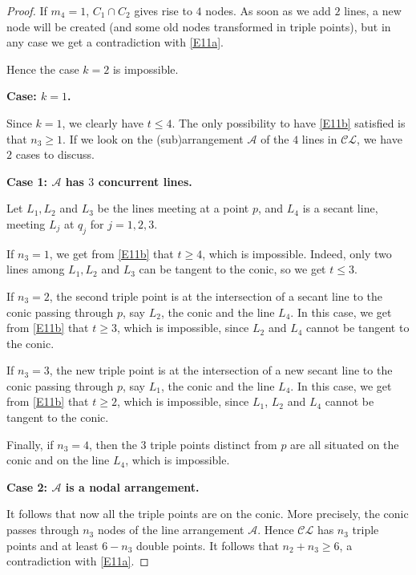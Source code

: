 \documentclass[12pt]{amsart}
\theoremstyle{plain}
\theoremstyle{definition}
\numberwithin{equation}{section}
\begin{document}
\begin{proof}
If $m_4=1$, $C_1\cap C_2$ gives rise to $4$ nodes. As soon as we add $2$ lines, a new node will be created (and some old nodes transformed in triple points), but in any case we get a contradiction with \eqref{E11a}.

Hence the case $k=2$ is impossible.

\medskip

{\bf Case: $k=1$.}

\medskip

Since $k=1$, we clearly have $t \leq 4$.
The only possibility to have \eqref{E11b} satisfied is that $n_3 \geq 1$.
If we look on the (sub)arrangement $\mathcal{A}$ of the $4$ lines in $\mathcal{CL}$, we have $2$ cases to discuss.

\medskip

{\bf Case 1: $\mathcal{A}$ has $3$ concurrent lines.}

\medskip

Let $L_1,L_2$ and $L_3$ be the lines meeting at a point $p$, and $L_4$ is a secant line, meeting $L_j$ at $q_j$ for $j=1,2,3$.

If $n_3=1$, we get from \eqref{E11b} that $t \geq 4$, which is impossible. Indeed, only two lines among $L_1,L_2$ and $L_3$ can be tangent to the conic, so we get $t \leq 3$.

If $n_3=2$, the second triple point is at the intersection of a secant line to the conic passing through $p$, say $L_2$, the conic and the line $L_4$. In this case, we get from \eqref{E11b} that $t \geq 3$, which is impossible, since $L_2$ and $L_4$ cannot be tangent to the conic.

If $n_3=3$, the new triple point is at the intersection of a new secant line to the conic passing through $p$, say $L_1$, the conic and the line $L_4$. In this case, we get from \eqref{E11b} that $t \geq 2$, which is impossible, since $L_1$, $L_2$ and $L_4$ cannot be tangent to the conic.

Finally, if $n_3=4$, then the 3 triple points distinct from $p$ are all situated on the conic and on the line $L_4$, which is impossible.

\medskip

{\bf Case 2: $\mathcal{A}$ is a nodal arrangement.}

\medskip

It follows that now all the triple points are on the conic. More precisely, the conic passes through $n_3$ nodes of the line arrangement $\mathcal{A}$. Hence $\mathcal{CL}$ has $n_3$ triple points and at least $6-n_3$ double points. It follows that $n_2+n_3 \geq 6$, a contradiction with \eqref{E11a}.
\end{proof}
\end{document}
